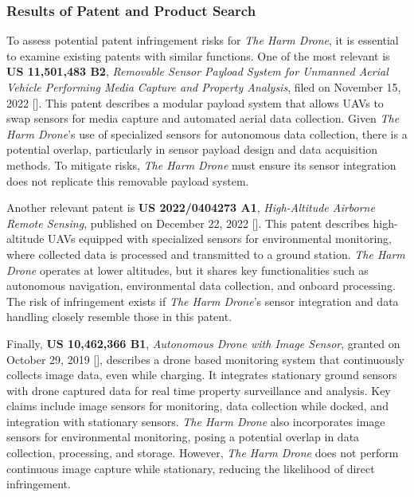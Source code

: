 \documentclass[12pt]{article}
\begin{document}
\subsubsection{Results of Patent and Product Search}

\par To assess potential patent infringement risks for \textit{The Harm Drone}, it is essential to examine existing patents with similar functions. One of the most relevant is \textbf{US 11,501,483 B2}, \textit{Removable Sensor Payload System for Unmanned Aerial Vehicle Performing Media Capture and Property Analysis}, filed on November 15, 2022 []. This patent describes a modular payload system that allows UAVs to swap sensors for media capture and automated aerial data collection. Given \textit{The Harm Drone}’s use of specialized sensors for autonomous data collection, there is a potential overlap, particularly in sensor payload design and data acquisition methods. To mitigate risks, \textit{The Harm Drone} must ensure its sensor integration does not replicate this removable payload system.

\par Another relevant patent is \textbf{US 2022/0404273 A1}, \textit{High-Altitude Airborne Remote Sensing}, published on December 22, 2022 []. This patent describes high-altitude UAVs equipped with specialized sensors for environmental monitoring, where collected data is processed and transmitted to a ground station. \textit{The Harm Drone} operates at lower altitudes, but it shares key functionalities such as autonomous navigation, environmental data collection, and onboard processing. The risk of infringement exists if \textit{The Harm Drone}’s sensor integration and data handling closely resemble those in this patent.

\par Finally, \textbf{US 10,462,366 B1}, \textit{Autonomous Drone with Image Sensor}, granted on October 29, 2019 [], describes a drone based monitoring system that continuously collects image data, even while charging. It integrates stationary ground sensors with drone captured data for real time property surveillance and analysis. Key claims include image sensors for monitoring, data collection while docked, and integration with stationary sensors. \textit{The Harm Drone} also incorporates image sensors for environmental monitoring, posing a potential overlap in data collection, processing, and storage. However, \textit{The Harm Drone} does not perform continuous image capture while stationary, reducing the likelihood of direct infringement.
\end{document}
